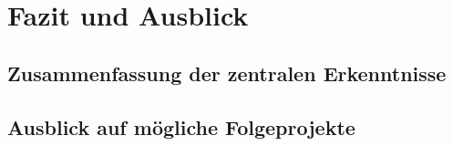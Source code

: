 
\section{Fazit und Ausblick} \label{sec:fazit}

\subsection{Zusammenfassung der zentralen Erkenntnisse}

\subsection{Ausblick auf mögliche Folgeprojekte}
